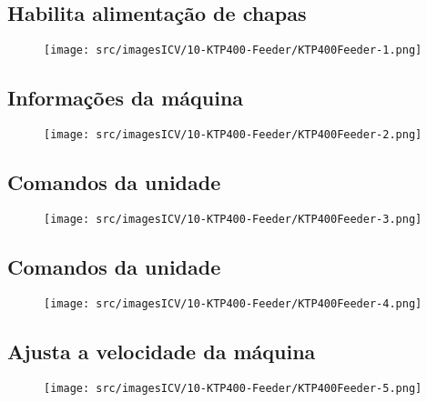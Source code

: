 \thispagestyle{fancy}
\vspace{\fill}
\subsection{\small Habilita alimentação de chapas}
\begin{figure}
    \centering
    \texttt{[image: src/imagesICV/10-KTP400-Feeder/KTP400Feeder-1.png]}
\end{figure}

\newpage
\thispagestyle{fancy}
\vspace{\fill}
\subsection{\small Informações da máquina}
\begin{figure}
    \centering
    \texttt{[image: src/imagesICV/10-KTP400-Feeder/KTP400Feeder-2.png]}
\end{figure}

\newpage
\thispagestyle{fancy}
\vspace{\fill}
\subsection{\small Comandos da unidade}
\begin{figure}
    \centering
    \texttt{[image: src/imagesICV/10-KTP400-Feeder/KTP400Feeder-3.png]}
\end{figure}

\newpage
\thispagestyle{fancy}
\vspace{\fill}
\subsection{\small Comandos da unidade}
\begin{figure}
    \centering
    \texttt{[image: src/imagesICV/10-KTP400-Feeder/KTP400Feeder-4.png]}
\end{figure}

\newpage
\thispagestyle{fancy}
\vspace{\fill}
\subsection{\small Ajusta a velocidade da máquina}
\begin{figure}
    \centering
    \texttt{[image: src/imagesICV/10-KTP400-Feeder/KTP400Feeder-5.png]}
\end{figure}

